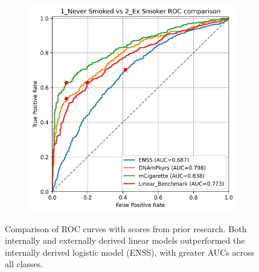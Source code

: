 \documentclass{article} %
\begin{document}
\begin{figure}[p]
\begin{subfigure}{0.48\linewidth}
    \end{subfigure}
    \begin{subfigure}{0.48\linewidth}
        \centering
        \includegraphics[width=\linewidth]{comparison_1v2.png}
    \end{subfigure}
    \caption[Comparison of ROC curves with models from prior research]{Comparison of ROC curves with scores from prior research. Both internally and externally derived linear models outperformed the internally derived logistic model (ENSS), with greater AUCs across all classes.}
    \label{fig:comparison-rocs}
\end{figure}
\end{document}
